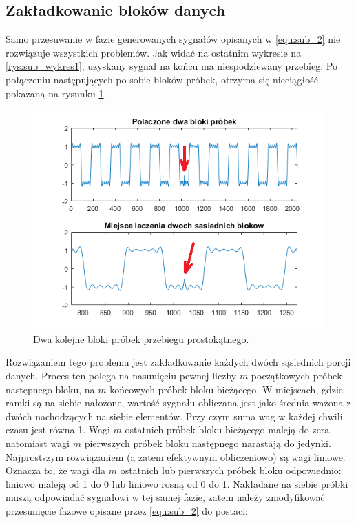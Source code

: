 \subsection{Zakładkowanie bloków danych}
Samo przesuwanie w fazie generowanych sygnałów opisanych w \ref{equ:sub_2} nie rozwiązuje wszystkich problemów. Jak widać na ostatnim wykresie na \ref{rys:sub_wykres1}, uzyskany sygnał na końcu ma niespodziewany przebieg. Po połączeniu następujących po sobie bloków próbek, otrzyma się nieciągłość pokazaną na rysunku \ref{rys:sub_zakladkowania_brak}.
\begin{figure}[H]
	\centering
	\includegraphics[width=12cm]{grafiki/sub_zakladkowania_brak}
	\captionsetup{justification=centering}
	\caption{Dwa kolejne bloki próbek przebiegu prostokątnego.}
	\label{rys:sub_zakladkowania_brak}
\end{figure}
Rozwiązaniem tego problemu jest zakładkowanie każdych dwóch sąsiednich porcji danych. Proces ten polega na nasunięciu pewnej liczby $m$ początkowych próbek następnego bloku, na $m$ końcowych próbek bloku bieżącego. W miejscach, gdzie ramki są na siebie nałożone, wartość sygnału obliczana jest jako średnia ważona z dwóch nachodzących na siebie elementów. Przy czym suma wag w każdej chwili czasu jest równa 1. Wagi $m$ ostatnich próbek bloku bieżącego maleją do zera, natomiast wagi $m$ pierwszych próbek bloku następnego narastają do jedynki. Najprostszym rozwiązaniem (a zatem efektywnym obliczeniowo) są wagi liniowe. Oznacza to, że wagi dla $m$ ostatnich lub pierwszych próbek bloku odpowiednio: liniowo maleją od 1 do 0 lub liniowo rosną od 0 do 1.
Nakładane na siebie próbki muszą odpowiadać sygnałowi w tej samej fazie, zatem należy zmodyfikować przesunięcie fazowe opisane przez \ref{equ:sub_2} do postaci:
